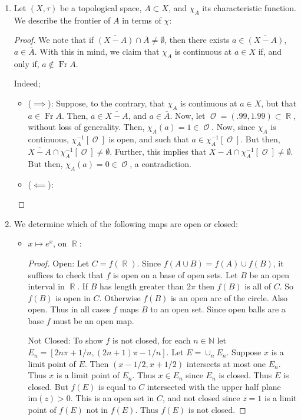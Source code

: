 \documentclass{book}
\DeclareMathOperator*{\R}{\mathbb{R}}
\DeclareMathOperator*{\Ocal}{\mathcal{O}}
\DeclareMathOperator*{\Ft}{\text{Fr}}
\begin{document}
\begin{enumerate}[(1)]
    \item Let $(X, \tau)$ be a topological space, $A \subset X$, and $\chi_A$ its characteristic function. We describe the frontier of $A$ in terms of $\chi$: 
        \begin{proof} We note that if $\overline{(X -A)} \cap \overline{A} \neq \emptyset$, then there exists $a \in \overline{(X -A)}$, $a \in \overline{A}$. With this in mind, we claim that $\chi_A$ is continuous at $a \in X$ if, and only if, $a \notin \Ft A$. 
            \par Indeed; 
            \begin{itemize}
                \item[] ($\implies$): Suppose, to the contrary, that $\chi_A$ is continuous at $a \in X$, but that $a \in \Ft A$. Then, $a \in \overline{X-A}$, and $a \in \overline{A}$. Now, let ${\Ocal} = (.99, 1.99) \subset \R$, without loss of generality. Then, $\chi_A(a) = 1 \in {\Ocal}$. Now, since $\chi_A$ is continuous, $\chi_A^{-1} [{\Ocal}]$ is open, and such that $a \in \chi_A^{-1} [{\Ocal}]$. But then, $\overline{X-A} \cap \chi_A^{-1} [{\Ocal}] \neq \emptyset$. Further, this implies that $X-A \cap \chi_A^{-1} [{\Ocal}] \neq \emptyset$. But then, $\chi_A(a) = 0 \in {\Ocal}$, a contradiction. 
                \item[] ($\impliedby$): 
            \end{itemize}
        \end{proof}

    \item We determine which of the following maps are open or closed: 
        \begin{itemize}
            \item $x \mapsto e^x$, on $\R$: 
                \begin{proof} Open: Let $C=f(\R)$.  Since $f(A\cup B)=f(A)\cup f(B)$, it suffices to check that $f$ is open on a base of open sets.  Let $B$ be an open interval in $\R$.  If $B$ has length greater than $2\pi$ then $f(B)$ is all of $C$.  So $f(B)$ is open in $C$.  Otherwise $f(B)$ is an open arc of the circle.  Also open.  Thus in all cases $f$ maps $B$ to an open set.  Since open balls are a base $f$ must be an open map.
                    \par Not Closed: To show $f$ is not closed, for each $n\in \mathbb N$ let $E_n=[2n\pi+1/n,(2n+1)\pi-1/n]$.  Let $E=\cup_nE_n$.  Suppose $x$ is a limit point of $E$.  Then $(x-1/2,x+1/2)$ intersects at most one $E_n$.  Thus $x$ is a limit point of $E_n$.  Thus $x\in E_n$ since $E_n$ is closed.  Thus $E$ is closed.  But $f(E)$ is equal to $C$ intersected with the upper half plane $\text{im}(z)>0$.   This is an open set in $C$, and not closed since $z=1$ is a limit point of $f(E)$ not in $f(E)$. Thus $f(E)$ is not closed.
                \end{proof}


\end{itemize}
\end{enumerate}
\end{document}

